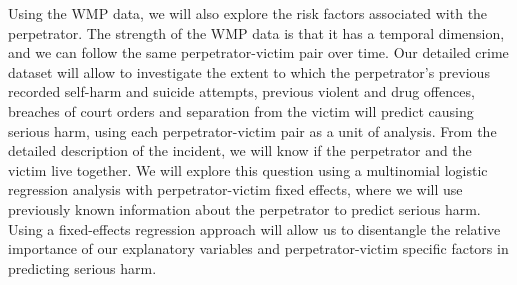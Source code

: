 \documentclass[11pt, a4paper]{article}
\begin{document}
Using the WMP data, we will also explore the risk factors associated with the perpetrator. The strength of the WMP data is that it has a temporal dimension, and we can follow the same perpetrator-victim pair over time. Our detailed crime dataset will allow to investigate the extent to which the perpetrator's previous recorded self-harm and suicide attempts, previous violent and drug offences, breaches of court orders and separation from the victim will predict causing serious harm, using each perpetrator-victim pair as a unit of analysis. From the detailed description of the incident, we will know if the perpetrator and the victim live together. We will explore this question using a multinomial logistic regression analysis with perpetrator-victim fixed effects, where we will use previously known information about the perpetrator to predict serious harm. Using a fixed-effects regression approach will allow us to disentangle the relative importance of our explanatory variables and perpetrator-victim specific factors in predicting serious harm.  

\end{document}
